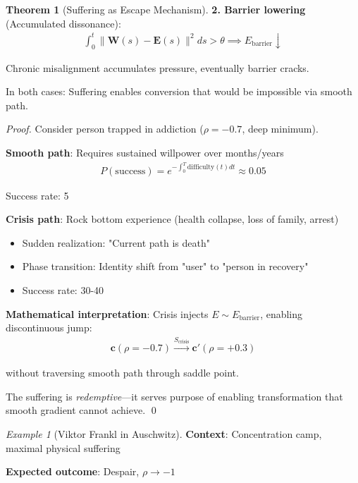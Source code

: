 \documentclass[11pt,a4paper]{article}
\theoremstyle{definition}
\newtheorem{theorem}{Theorem}[section]
\theoremstyle{remark}
\newtheorem{example}{Example}[section]
\newcommand{\EE}{\mathbf{E}}
\newcommand{\WW}{\mathbf{W}}
\newcommand{\cc}{\mathbf{c}}
\begin{document}
\begin{small}
\begin{enumerate}
\begin{theorem}[Suffering as Escape Mechanism]
\textbf{2. Barrier lowering} (Accumulated dissonance):
\begin{align}
\int_0^t \|\WW(s) - \EE(s)\|^2 ds > \theta \implies E_{\text{barrier}} \downarrow
\end{align}

Chronic misalignment accumulates pressure, eventually barrier cracks.

In both cases: Suffering enables conversion that would be impossible via smooth path.
\end{theorem}

\begin{proof}
Consider person trapped in addiction (\(\rho = -0.7\), deep minimum).

\textbf{Smooth path}: Requires sustained willpower over months/years
\begin{align}
P(\text{success}) = e^{-\int_0^T \text{difficulty}(t) dt} \approx 0.05
\end{align}

Success rate: 5%

\textbf{Crisis path}: Rock bottom experience (health collapse, loss of family, arrest)
\begin{itemize}
    \item Sudden realization: "Current path is death"
    \item Phase transition: Identity shift from "user" to "person in recovery"
    \item Success rate: 30-40%
\end{itemize}

\textbf{Mathematical interpretation}: Crisis injects \(E \sim E_{\text{barrier}}\), enabling discontinuous jump:
\begin{align}
\cc(\rho = -0.7) \xrightarrow{S_{\text{crisis}}} \cc'(\rho = +0.3)
\end{align}

without traversing smooth path through saddle point.

The suffering is \textit{redemptive}—it serves purpose of enabling transformation that smooth gradient cannot achieve. \qed
\end{proof}

\begin{example}[Viktor Frankl in Auschwitz]
\textbf{Context}: Concentration camp, maximal physical suffering

\textbf{Expected outcome}: Despair, \(\rho \to -1\)


\end{example}
\end{enumerate}
\end{small}
\end{document}
